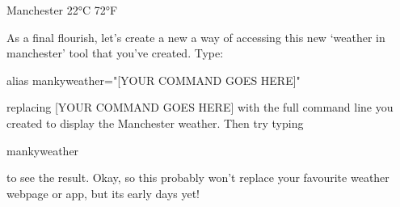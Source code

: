 \begin{ttoutenv}
   [33]Manchester 22°C 72°F
\end{ttoutenv}

As a final flourish, let's create a new a way of accessing this new `weather in manchester' tool that you've created. Type:

\begin{ttoutenv}
alias mankyweather="[YOUR COMMAND GOES HERE]"
\end{ttoutenv}

replacing [YOUR COMMAND GOES HERE] with the full command line you created to display the Manchester weather. Then try typing

\begin{ttoutenv}
mankyweather
\end{ttoutenv}

to see the result. Okay, so this probably won't replace your favourite weather webpage or app, but its early days yet! 









 







